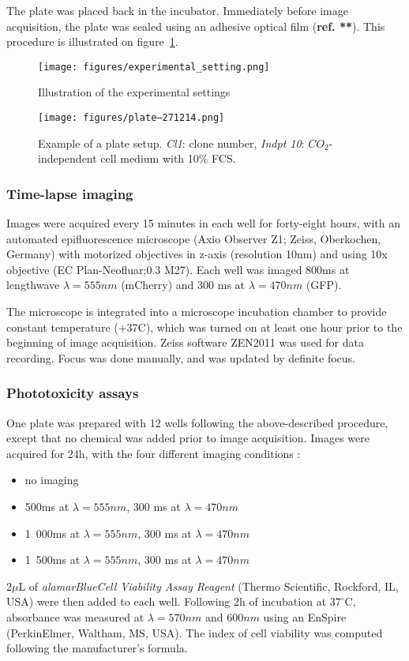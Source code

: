 The plate was placed back in the incubator. Immediately before image acquisition, the plate was sealed using an adhesive optical film (\textbf{ref. **}). This procedure is illustrated on figure~\ref{exp_setting}.

\begin{figure}
\centering
\texttt{[image: figures/experimental\_setting.png]}
\caption{Illustration of the experimental settings}
\label{exp_setting}
\end{figure}
\begin{figure}
\centering
\texttt{[image: figures/plate--271214.png]}
\caption{Example of a plate setup. \textit{Cl1}: clone number, \textit{Indpt 10}: $CO_2$-independent cell medium with 10\% FCS.}
\label{plate_setup}
\end{figure}
\subsubsection{Time-lapse imaging}
Images were acquired every 15 minutes in each well for forty-eight hours, with an automated epifluorescence microscope (Axio Observer Z1; Zeiss, Oberkochen, Germany) with motorized objectives in z-axis (resolution 10nm) and using 10x objective (EC Plan-Neofluar;0.3 M27). Each well was imaged 800ms at lengthwave $\lambda = 555nm$ (mCherry) and 300 ms at $\lambda = 470nm$ (GFP).

The microscope is integrated into a microscope incubation chamber to provide constant temperature (+37C), which was turned on at least one hour prior to the beginning of image acquisition. Zeiss software ZEN2011 was used for data recording. Focus was done manually, and was updated by definite focus.
\subsubsection{Phototoxicity assays}
One plate was prepared with 12 wells following the above-described procedure, except that no chemical was added prior to image acquisition. Images were acquired for 24h, with the four different imaging conditions :
\begin{itemize}
\item no imaging
\item 500ms at $\lambda = 555nm$, 300 ms at $\lambda = 470nm$
\item 1~000ms at $\lambda = 555nm$, 300 ms at $\lambda = 470nm$
\item 1~500ms at $\lambda = 555nm$, 300 ms at $\lambda = 470nm$
\end{itemize}
2$\mu$L of \textit{alamarBlue\texttrademark Cell Viability Assay Reagent} (Thermo Scientific, Rockford, IL, USA) were then added to each well. Following 2h of incubation at $37^\circ$C, absorbance was measured at $\lambda = 570nm$ and $600nm$ using an EnSpire\up{\textregistered} (PerkinElmer, Waltham, MS, USA). The index of cell viability was computed following the manufacturer's formula.

